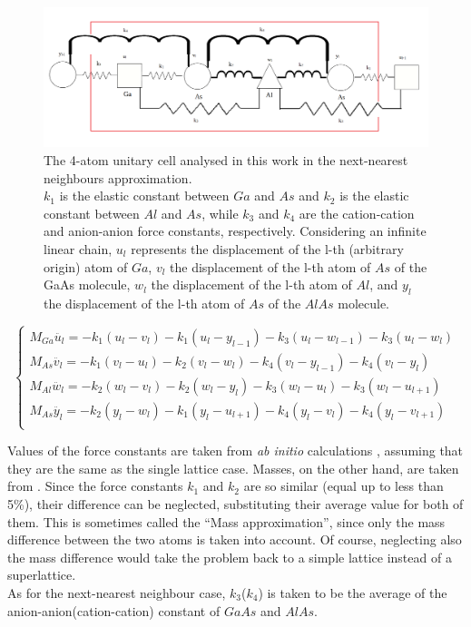\documentclass{article}
\begin{document}
\begin{figure}
	\centering
	\includegraphics[width=0.7\linewidth]{cella2.png}
	\caption{The 4-atom unitary cell analysed in this work in the next-nearest neighbours approximation.\\
	$k_1$ is the elastic constant between $Ga$ and $As$ and $k_2$ is the elastic constant between $Al$ and $As$, while $k_3$ and $k_4$ are the cation-cation and anion-anion force constants, respectively. Considering an infinite linear chain, $u_l$ represents the displacement of the l-th (arbitrary origin) atom of $Ga$, $v_l$ the displacement of the l-th atom of $As$ of the GaAs molecule, $w_l$ the displacement of the l-th atom of $Al$, and $y_l$ the displacement of the l-th atom of $As$ of the $AlAs$ molecule.   }
	\label{fig:cella2}
\end{figure}
\begin{equation}
	\begin{cases}
		M_{Ga}\ddot{u_l} = -k_1(u_l-v_l) - k_1(u_l-y_{l-1}) - k_3(u_l -w_{l-1}) - k_3(u_l - w_{l})	 \\
		M_{As}\ddot{v_l} = -k_1(v_l-u_l) - k_2(v_l-w_l)	- k_4(v_l -y_{l-1}) - k_4(v_l - y_{l})	 	 \\
		M_{Al}\ddot{w_l} = -k_2(w_l-v_l) - k_2(w_l-y_l)	- k_3(w_l - u_l) - k_3(w_l - u_{l+1})	 	 \\
		M_{As}\ddot{y_l} = -k_2(y_l-w_l) - k_1(y_l-u_{l+1})- k_4(y_l -v_l) - k_4(y_l - v_{l+1})	  \\
	\end{cases}
	\label{eq:sistema}	
\end{equation}

Values of the force constants are taken from \emph{ab initio} calculations \cite[Table 2]{Molinari}, assuming that they are the same as the single lattice case. Masses, on the other hand, are taken from \cite{IUPAC}.
Since the force constants $k_1$ and $k_2$ are so similar (equal up to less than 5\%), their difference can be neglected, substituting their average value for both of them. This is sometimes called the “Mass approximation”, since only the mass difference between the two atoms is taken into account. Of course, neglecting also the mass difference would take the problem back to a simple lattice instead of a superlattice.\\
As for the next-nearest neighbour case, $k_3$($k_4$) is taken to be the average of the anion-anion(cation-cation) constant of $GaAs$ and $AlAs$.
\end{document}
